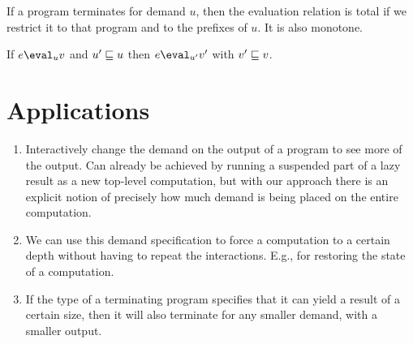 \documentclass[usenames,dvipsnames,preprint]{sigplanconf}
\begin{document}
If a program terminates for demand $u$, then the evaluation relation
is total if we restrict it to that program and to the prefixes of
$u$. It is also monotone.

\begin{theorem}
  If $e \eval_{u} v$ and $u' \sqsubseteq u$ then $e \eval_{u'} v'$ with $v'
  \sqsubseteq v$.
\end{theorem}

\section{Applications}

\begin{enumerate}
\item Interactively change the demand on the output of a program to
  see more of the output. Can already be achieved by running a
  suspended part of a lazy result as a new top-level computation, but
  with our approach there is an explicit notion of precisely how much
  demand is being placed on the entire computation.
\item We can use this demand specification to force a computation to a
  certain depth without having to repeat the interactions. E.g., for
  restoring the state of a computation.
\item If the type of a terminating program specifies that it can yield
  a result of a certain size, then it will also terminate for any
  smaller demand, with a smaller output.
\end{enumerate}

\pagebreak


{

\small

}
\end{document}
